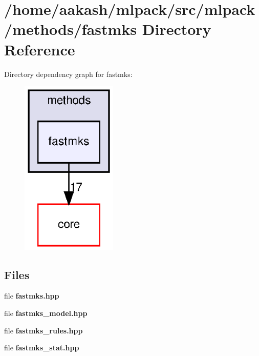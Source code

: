 \section{/home/aakash/mlpack/src/mlpack/methods/fastmks Directory Reference}
\label{dir_4660db6ad81c659834e5c7f254d158da}
Directory dependency graph for fastmks\+:
\nopagebreak
\begin{figure}[H]
\begin{center}
\leavevmode
\includegraphics[width=130pt]{dir_4660db6ad81c659834e5c7f254d158da_dep}
\end{center}
\end{figure}
\subsection*{Files}
\begin{DoxyCompactItemize}
\item 
file \textbf{ fastmks.\+hpp}
\item 
file \textbf{ fastmks\+\_\+model.\+hpp}
\item 
file \textbf{ fastmks\+\_\+rules.\+hpp}
\item 
file \textbf{ fastmks\+\_\+stat.\+hpp}
\end{DoxyCompactItemize}
